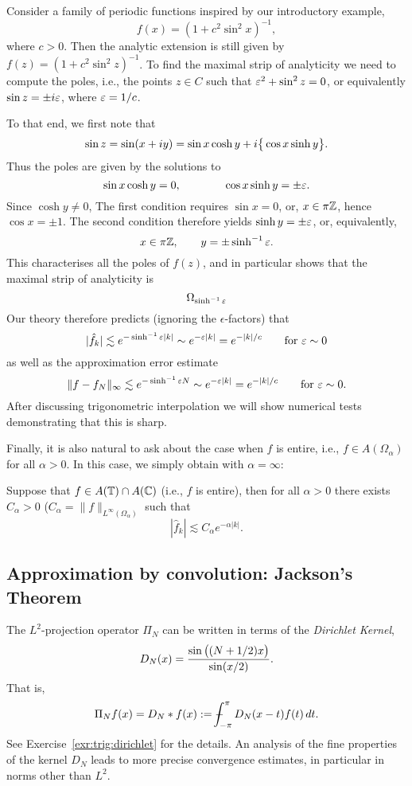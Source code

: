 \begin{example}
  Consider a family of periodic functions inspired by our introductory example,
  \[
    f(x) = (1 + c^2 \sin^2 x)^{-1},
  \]
  where $c > 0$. Then the analytic extension is still given by $f(z) = (1 + c^2
  \sin^2 z)^{-1}$. To find the maximal strip of analyticity we need to compute
  the poles, i.e., the points $z \in C$ such that $\varepsilon^2 + \sin^2 z = 0$, or
  equivalently $\sin z = \pm i \varepsilon$, where $\varepsilon = 1/c$.

  To that end, we first note that
  \[
    \sin z = \sin (x + i y) = \sin x \cosh y + i \big\{ \cos x \sinh y \big\}.
  \]
  Thus the poles are given by the solutions to
  \[
       \sin x \cosh y = 0, \qquad \qquad
       \cos x \sinh y = \pm \varepsilon.
  \]
  Since $\cosh y \neq 0$, The first condition requires $\sin x = 0$, or,
  $x \in \pi \mathbb{Z}$, hence $\cos x = \pm 1$. The second condition therefore
  yields $\sinh y = \pm \varepsilon$, or, equivalently,
  \[
      x \in \pi \mathbb{Z}, \qquad y = \pm \sinh^{-1} \varepsilon.
  \]
  This characterises all the poles of $f(z)$, and in particular shows that
  the maximal strip of analyticity is
  \[
      \Omega_{\sinh^{-1} \varepsilon}
  \]
  Our theory therefore predicts (ignoring the $\epsilon$-factors) that
  \[
      |\hat{f}_k| \lesssim e^{- \sinh^{-1} \varepsilon |k|}
            \sim e^{- \varepsilon |k|} = e^{-|k|/c} \qquad \text{for $\varepsilon \sim 0$}
  \]
  as well as the approximation error estimate
  \[
      \| f - f_N \|_\infty \lesssim e^{- \sinh^{-1} \varepsilon N} \sim e^{- \varepsilon |k|}
      = e^{-|k|/c}
      \qquad \text{for $\varepsilon \sim 0$.}
  \]
  After discussing trigonometric interpolation we will show numerical
  tests demonstrating that this is sharp.
\end{example}


Finally, it is also natural to ask about the case when $f$ is entire, i.e.,
$f \in A(\Omega_\alpha)$ for all $\alpha > 0$. In this case, we simply
obtain  with $\alpha = \infty$:

\begin{corollary} \label{th:trig:pw-entire}
  Suppose that $f \in A(\mathbb{T}) \cap A(\mathbb{C})$  (i.e., $f$ is entire), then for all
  $\alpha > 0$ there exists $C_\alpha > 0$ ($C_\alpha =
  \|f\|_{L^\infty(\Omega_\alpha)}$ such that
  \[
      |\hat{f}_k| \lesssim C_\alpha e^{-\alpha |k|}.
  \]
\end{corollary}




\subsection{Approximation by convolution: Jackson's Theorem}
%
\label{sec:trig:jackson}
%
The $L^2$-projection operator $\Pi_N$ can be written in terms of the {\em Dirichlet Kernel}, 
\[
    D_N(x) = \frac{\sin\big( (N+1/2) x \big)}{ \sin(x/2) }.
\]
That is, 
\[
  \Pi_N f(x) = D_N \ast f(x) := \mint_{-\pi}^\pi D_N(x-t) f(t) \, dt. 
\]
See Exercise~\ref{exr:trig:dirichlet} for the details. An analysis of the fine properties of the kernel $D_N$ leads to more precise convergence estimates, in particular in norms other than $L^2$. 

